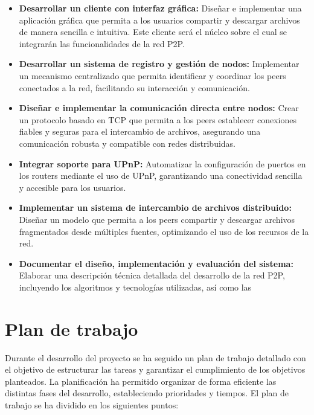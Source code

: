 \begin{itemize}
    \item \textbf{Desarrollar un cliente con interfaz gráfica:} Diseñar e implementar una aplicación gráfica que permita a los usuarios compartir y descargar archivos de manera sencilla e intuitiva. Este cliente será el núcleo sobre el cual se integrarán las funcionalidades de la red P2P.

    \item \textbf{Desarrollar un sistema de registro y gestión de nodos:} Implementar un mecanismo centralizado que permita identificar y coordinar los peers conectados a la red, facilitando su interacción y comunicación.

    \item \textbf{Diseñar e implementar la comunicación directa entre nodos:} Crear un protocolo basado en TCP que permita a los peers establecer conexiones fiables y seguras para el intercambio de archivos, asegurando una comunicación robusta y compatible con redes distribuidas.

    \item \textbf{Integrar soporte para UPnP:} Automatizar la configuración de puertos en los routers mediante el uso de UPnP, garantizando una conectividad sencilla y accesible para los usuarios.

    \item \textbf{Implementar un sistema de intercambio de archivos distribuido:} Diseñar un modelo que permita a los peers compartir y descargar archivos fragmentados desde múltiples fuentes, optimizando el uso de los recursos de la red.

    \item \textbf{Documentar el diseño, implementación y evaluación del sistema:} Elaborar una descripción técnica detallada del desarrollo de la red P2P, incluyendo los algoritmos y tecnologías utilizadas, así como las

\end{itemize}


\section{Plan de trabajo}

Durante el desarrollo del proyecto se ha seguido un plan de trabajo detallado con el objetivo de estructurar las tareas y garantizar el cumplimiento de los objetivos planteados. La planificación ha permitido organizar de forma eficiente las distintas fases del desarrollo, estableciendo prioridades y tiempos. El plan de trabajo se ha dividido en los siguientes puntos:

